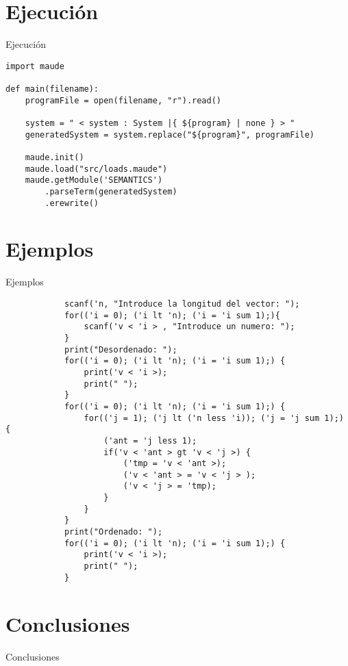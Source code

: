 \documentclass{beamer}
\begin{document}
    \section{Ejecución}
    \begin{frame}[fragile]{Ejecución}
        \begin{verbatim}  
import maude
     
def main(filename):
    programFile = open(filename, "r").read()
            
    system = " < system : System |{ ${program} | none } > "
    generatedSystem = system.replace("${program}", programFile)
            
    maude.init()
    maude.load("src/loads.maude")
    maude.getModule('SEMANTICS')
        .parseTerm(generatedSystem)
        .erewrite()
        \end{verbatim}
    \end{frame}
    
    \section{Ejemplos}
    \begin{frame}[fragile]{Ejemplos}
        \begin{verbatim}  
            scanf('n, "Introduce la longitud del vector: ");
            for(('i = 0); ('i lt 'n); ('i = 'i sum 1);){
                scanf('v < 'i > , "Introduce un numero: ");
            }
            print("Desordenado: ");
            for(('i = 0); ('i lt 'n); ('i = 'i sum 1);) {
                print('v < 'i >);
                print(" ");
            }
            for(('i = 0); ('i lt 'n); ('i = 'i sum 1);) {
                for(('j = 1); ('j lt ('n less 'i)); ('j = 'j sum 1);) {
                    ('ant = 'j less 1);
                    if('v < 'ant > gt 'v < 'j >) {
                        ('tmp = 'v < 'ant >);
                        ('v < 'ant > = 'v < 'j > );
                        ('v < 'j > = 'tmp);
                    }
                }
            }
            print("Ordenado: ");
            for(('i = 0); ('i lt 'n); ('i = 'i sum 1);) {
                print('v < 'i >);
                print(" ");
            }
        \end{verbatim}
    \end{frame}

    \section{Conclusiones}
    \begin{frame}{Conclusiones}
    \end{frame}
\end{document}
